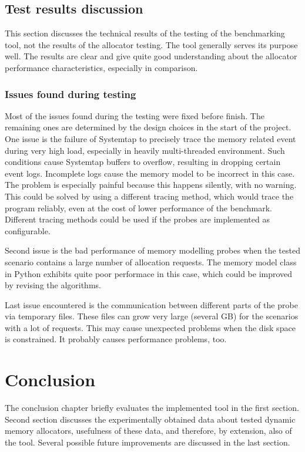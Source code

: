 \section{Test results discussion}

This section discusses the technical results of the testing of the benchmarking tool, not the results of the allocator testing. The tool generally serves its purpose well. The results are clear and give quite good understanding about the allocator performance characteristics, especially in comparison.

\subsection{Issues found during testing}
\label{issues}

Most of the issues found during the testing were fixed before finish. The remaining ones are determined by the design choices in the start of the project. One issue is the failure of Systemtap to precisely trace the memory related event during very high load, especially in heavily multi-threaded environment. Such conditions cause Systemtap buffers to overflow, resulting in dropping certain event logs. Incomplete logs cause the memory model to be incorrect in this case. The problem is especially painful because this happens silently, with no warning. This could be solved by using a different tracing method, which would trace the program reliably, even at the cost of lower performance of the benchmark. Different tracing methods could be used if the probes are implemented as configurable.

Second issue is the bad performance of memory modelling probes when the tested scenario contains a large number of allocation requests. The memory model class in Python exhibits quite poor performace in this case, which could be improved by revising the algorithms.

Last issue encountered is the communication between different parts of the probe via temporary files. These files can grow very large (several GB) for the scenarios with a lot of requests. This may cause unexpected problems when the disk space is constrained. It probably causes performance problems, too.

\chapter{Conclusion}

The conclusion chapter briefly evaluates the implemented tool in the first section. Second section discusses the experimentally obtained data about tested dynamic memory allocators, usefulness of these data, and therefore, by extension, also of the tool. Several possible future improvements are discussed in the last section.

